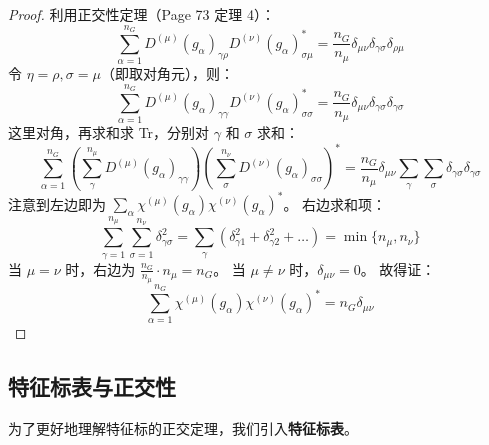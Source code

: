 \begin{proof}
    利用正交性定理（Page 73 定理 4）：
    \begin{equation}
        \sum_{\alpha=1}^{n_G} D^{(\mu)}(g_\alpha)_{\gamma\rho} D^{(\nu)}(g_\alpha)_{\sigma\mu}^* = \frac{n_G}{n_\mu} \delta_{\mu\nu} \delta_{\gamma\sigma} \delta_{\rho\mu}
    \end{equation}
    令 $\eta = \rho, \sigma = \mu$（即取对角元），则：
    \begin{equation}
        \sum_{\alpha=1}^{n_G} D^{(\mu)}(g_\alpha)_{\gamma\gamma} D^{(\nu)}(g_\alpha)_{\sigma\sigma}^* = \frac{n_G}{n_\mu} \delta_{\mu\nu} \delta_{\gamma\sigma} \delta_{\gamma\sigma}
    \end{equation}
    这里对角，再求和求 Tr，分别对 $\gamma$ 和 $\sigma$ 求和：
    \begin{equation}
        \sum_{\alpha=1}^{n_G} \left( \sum_{\gamma}^{n_\mu} D^{(\mu)}(g_\alpha)_{\gamma\gamma} \right) \left( \sum_{\sigma}^{n_\nu} D^{(\nu)}(g_\alpha)_{\sigma\sigma} \right)^* = \frac{n_G}{n_\mu} \delta_{\mu\nu} \sum_{\gamma} \sum_{\sigma} \delta_{\gamma\sigma} \delta_{\gamma\sigma}
    \end{equation}
    注意到左边即为 $\sum_{\alpha} \chi^{(\mu)}(g_\alpha) \chi^{(\nu)}(g_\alpha)^*$。
    右边求和项：
    \begin{equation}
        \sum_{\gamma=1}^{n_\mu} \sum_{\sigma=1}^{n_\nu} \delta_{\gamma\sigma}^2 = \sum_{\gamma} (\delta_{\gamma 1}^2 + \delta_{\gamma 2}^2 + \dots) = \min\{n_\mu, n_\nu\}
    \end{equation}
    当 $\mu = \nu$ 时，右边为 $\frac{n_G}{n_\mu} \cdot n_\mu = n_G$。
    当 $\mu \neq \nu$ 时，$\delta_{\mu\nu} = 0$。
    故得证：
    \begin{equation}
        \sum_{\alpha=1}^{n_G} \chi^{(\mu)}(g_\alpha) \chi^{(\nu)}(g_\alpha)^* = n_G \delta_{\mu\nu}
    \end{equation}
\end{proof}






\subsection{特征标表与正交性}

为了更好地理解特征标的正交定理，我们引入\textbf{特征标表}。


